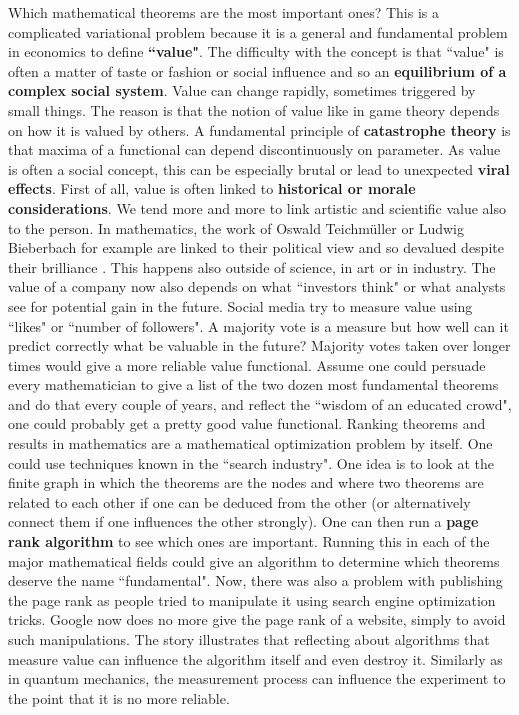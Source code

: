 \documentclass[12pt]{amsart}
\newcounter{example}    \def\example#1{ \item \fontsize{12}{15} \selectfont #1 \fontsize{12}{15} \selectfont }
\begin{document}
Which mathematical theorems are the most important ones? This is a complicated
variational problem because it is a general and fundamental problem in economics 
to define {\bf ``value"}. The difficulty with the concept is that ``value"
is often a matter of taste or fashion or 
social influence and so an {\bf equilibrium of a complex social system}. 
Value can change rapidly, sometimes triggered by small things. 
The reason is that the notion of value like in game theory depends on 
how it is valued by others. A fundamental principle of 
{\bf catastrophe theory} is that maxima of a functional can depend discontinuously 
on parameter. As value is often a social concept, this can be especially
brutal or lead to unexpected {\bf viral effects}. First of all, value is often 
linked to {\bf historical or morale considerations}. We tend more and more to link
artistic and scientific value also to the person. In mathematics, the work of 
Oswald Teichm\"uller or Ludwig Bieberbach for example are linked to their 
political view and so devalued despite their brilliance \cite{Segal2003}.
This happens also outside of science, in art or in industry. 
The value of a company now also depends on what ``investors think" or what 
analysts see for potential gain in the future. Social media try to measure 
value using ``likes" or ``number of followers". A majority vote is a measure
but how well can it predict correctly what be valuable in the future? Majority votes 
taken over longer times would give a more reliable value functional. Assume one could persuade every 
mathematician to give a list of the two dozen most fundamental theorems and do that 
every couple of years, and reflect the ``wisdom of an educated crowd", one could probably get a 
pretty good value functional. Ranking theorems and results in mathematics are a mathematical 
optimization problem by itself. One could use techniques known in the ``search industry".
One idea is to look at the finite graph in which the theorems are the nodes and where
two theorems are related to each other if one can be deduced
from the other (or alternatively connect them if one influences the
other strongly). One can then run a {\bf page rank algorithm} \cite{LangvilleMeyer}
to see which ones are important.
Running this in each of the major mathematical fields could give
an algorithm to determine which theorems deserve the name ``fundamental".
Now, there was also a problem with publishing the page rank as people tried to manipulate
it using search engine optimization tricks. Google now does no more give the page rank
of a website, simply to avoid such manipulations. The story illustrates that reflecting
about algorithms that measure value can influence the algorithm itself and even destroy it.
Similarly as in quantum mechanics, the measurement process can influence the
experiment to the point that it is no more reliable. 
\end{document}
